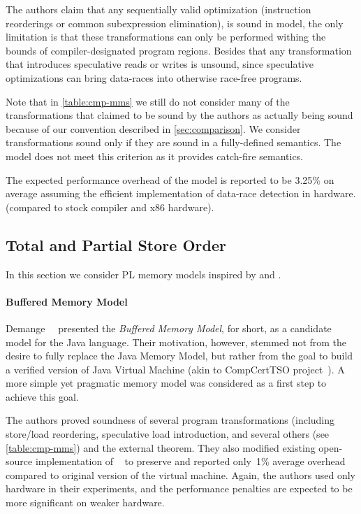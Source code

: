 The authors claim that any sequentially valid optimization 
(\eg instruction reorderings or common subexpression elimination),
is sound in \DRFx model, the only limitation is that
these transformations can only be performed
withing the bounds of compiler-designated program regions.
Besides that any transformation that introduces 
speculative reads or writes is unsound,
since speculative optimizations can bring
data-races into otherwise race-free programs.

Note that in \cref{table:cmp-mms} we still do not consider 
many of the transformations that claimed to be sound by the authors
as actually being sound because of our convention described in \cref{sec:comparison}.
We consider transformations sound only if they are 
sound in a fully-defined semantics. 
The \DRFx model does not meet this criterion as 
it provides catch-fire semantics.

The expected performance overhead of the model 
is reported to be 3.25\% on average
assuming the efficient implementation 
of data-race detection in hardware. 
(compared to stock compiler and x86 hardware). 

\subsection{Total and Partial Store Order}

In this section we consider PL memory models 
inspired by \TSO and \PSO.  

\paragraph{Buffered Memory Model}

Demange~\etal~\cite{Demange-al:POPL13} presented 
the \emph{Buffered Memory Model}, \BMM for short,
as a candidate model for the Java language.
Their motivation, however, stemmed not from the desire 
to fully replace the Java Memory Model, but rather 
from the goal to build a verified version of 
Java Virtual Machine (akin to CompCertTSO project~\cite{Sevcik-al:JACM13}).
A more simple yet pragmatic memory \TSO model 
was considered as a first step to achieve this goal. 

The authors proved soundness of several program transformations
(including store/load reordering, speculative load introduction,
and several others (see \cref{table:cmp-mms})
and the external \DRF theorem. 
They also modified existing open-source implementation of 
\JVM~\cite{Pizlo-al:ECCS10} to preserve \BMM and 
reported only~1\% average overhead 
compared to original version of the virtual machine. 
Again, the authors used only \Intel hardware in their 
experiments, and the performance penalties 
are expected to be more significant on weaker hardware.   

